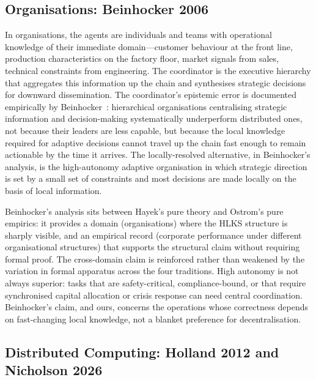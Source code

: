 \documentclass[11pt]{article}
\theoremstyle{definition}
\theoremstyle{plain}
\theoremstyle{plain}
\begin{document}
\subsection{Organisations: Beinhocker 2006}

In organisations, the agents are individuals and teams with operational
knowledge of their immediate domain---customer behaviour at the front line,
production characteristics on the factory floor, market signals from sales,
technical constraints from engineering. The coordinator is the executive
hierarchy that aggregates this information up the chain and synthesises
strategic decisions for downward dissemination. The coordinator's epistemic
error is documented empirically by Beinhocker~\cite{beinhocker2006}:
hierarchical organisations centralising strategic information and
decision-making systematically underperform distributed ones, not because
their leaders are less capable, but because the local knowledge required for
adaptive decisions cannot travel up the chain fast enough to remain actionable
by the time it arrives. The locally-resolved alternative, in Beinhocker's
analysis, is the high-autonomy adaptive organisation in which strategic
direction is set by a small set of constraints and most decisions are made
locally on the basis of local information.

Beinhocker's analysis sits between Hayek's pure theory and Ostrom's pure
empirics: it provides a domain (organisations) where the HLKS structure is
sharply visible, and an empirical record (corporate performance under
different organisational structures) that supports the structural claim
without requiring formal proof. The cross-domain claim is reinforced rather
than weakened by the variation in formal apparatus across the four traditions. High
autonomy is not always superior: tasks that are safety-critical, compliance-bound, or
that require synchronised capital allocation or crisis response can need central
coordination. Beinhocker's claim, and ours, concerns the operations whose correctness
depends on fast-changing local knowledge, not a blanket preference for
decentralisation.

\subsection{Distributed Computing: Holland 2012 and Nicholson 2026}
\end{document}
